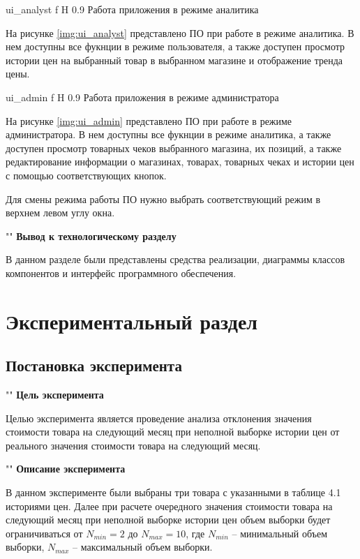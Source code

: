 \documentclass[a4paper]{bmstu}
\begin{document}
	{ui_analyst}
	{f}
	{H}
	{0.9\textwidth}
	{Работа приложения в режиме аналитика}
	
На рисунке \ref{img:ui_analyst} представлено ПО при работе в режиме аналитика. В нем доступны все фукнции в режиме пользователя, а также доступен просмотр истории цен на выбранный товар в выбранном магазине и отображение тренда цены.

	{ui_admin}
	{f}
	{H}
	{0.9\textwidth}
	{Работа приложения в режиме администратора}

На рисунке \ref{img:ui_admin} представлено ПО при работе в режиме администратора. В нем доступны все фукнции в режиме аналитика, а также доступен просмотр товарных чеков выбранного магазина, их позиций, а также редактирование информации о магазинах, товарах, товарных чеках и истории цен с помощью соответствующих кнопок.

Для смены режима работы ПО нужно выбрать соответствующий режим в верхнем левом углу окна.

""\newline
\noindent\textbf{Вывод к технологическому разделу}

В данном разделе были представлены средства реализации, диаграммы классов компонентов и интерфейс программного обеспечения.

\chapter{Экспериментальный раздел}

\section{Постановка эксперимента}

""\newline
\noindent\textbf{Цель эксперимента}

Целью эксперимента является проведение анализа отклонения значения стоимости товара на следующий месяц при неполной выборке истории цен от реального значения стоимости товара на следующий месяц.

""\newline
\noindent\textbf{Описание эксперимента}

В данном эксперименте были выбраны три товара с указанными в таблице 4.1 историями цен. Далее при расчете очередного значения стоимости товара на следующий месяц при неполной выборке истории цен объем выборки будет ограничиваться от $N_{min} = 2$ до $N_{max} = 10$, где $N_{min}$ -- минимальный объем выборки, $N_{max}$ -- максимальный объем выборки.
	
\end{document}
